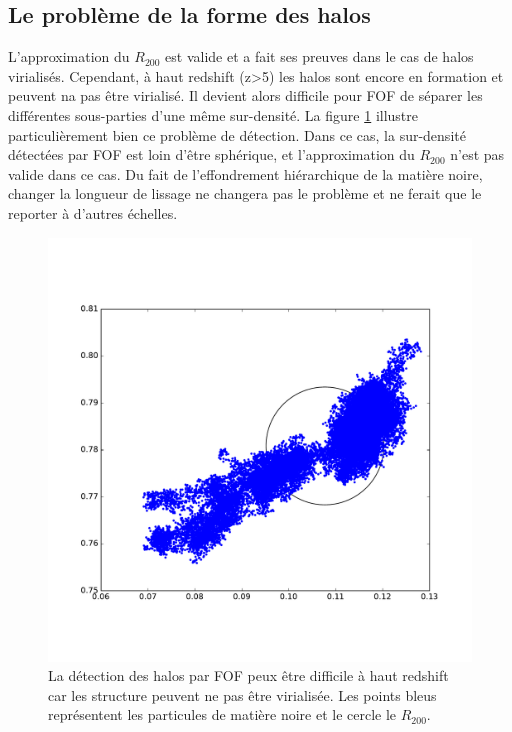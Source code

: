 \subsection{Le problème de la forme des halos}


L'approximation du $R_{200}$ est valide et a fait ses preuves dans le cas de halos virialisés.  %
Cependant, à haut redshift (z>5) les halos sont encore en formation et peuvent na pas être virialisé.
Il devient alors difficile pour \ac{FOF} de séparer les différentes sous-parties d'une même sur-densité.
La figure \ref{fig:part_halo} illustre particulièrement bien ce problème de détection.
Dans ce cas, la sur-densité détectées par \ac{FOF} est loin d'être sphérique, et l'approximation du $R_{200}$ n'est pas valide dans ce cas.
Du fait de l'effondrement hiérarchique de la matière noire, changer la longueur de lissage ne changera pas le problème et ne ferait que le reporter à d'autres échelles.

\begin{figure}
	\centering
	\includegraphics[width=.75\textwidth]{img/03/part_halo_R200.pdf} 
    \caption[Détection des halos]{La détection des halos par \ac{FOF} peux être difficile à haut redshift car les structure peuvent ne pas être virialisée.
    Les points bleus représentent les particules de matière noire et le cercle le $R_{200}$.
 	\label{fig:part_halo}}
\end{figure}


